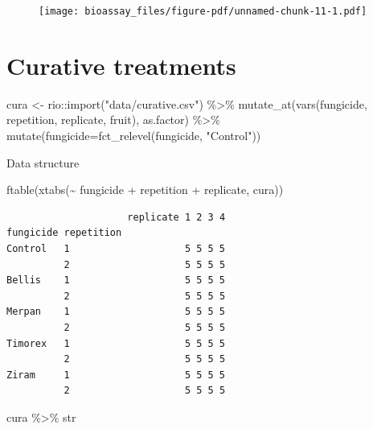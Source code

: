 \documentclass[
  letterpaper,
  DIV=11,
  numbers=noendperiod]{scrreport}
\newenvironment{Shaded}{\begin{snugshade}}{\end{snugshade}}
\newcommand{\AttributeTok}[1]{\textcolor[rgb]{0.40,0.45,0.13}{#1}}
\newcommand{\FunctionTok}[1]{\textcolor[rgb]{0.28,0.35,0.67}{#1}}
\newcommand{\NormalTok}[1]{\textcolor[rgb]{0.00,0.23,0.31}{#1}}
\newcommand{\OtherTok}[1]{\textcolor[rgb]{0.00,0.23,0.31}{#1}}
\newcommand{\SpecialCharTok}[1]{\textcolor[rgb]{0.37,0.37,0.37}{#1}}
\newcommand{\StringTok}[1]{\textcolor[rgb]{0.13,0.47,0.30}{#1}}
\begin{document}
\begin{figure}[H]

{\centering \texttt{[image: bioassay\_files/figure-pdf/unnamed-chunk-11-1.pdf]}

}

\end{figure}

\hypertarget{curative-treatments}{%
\section{Curative treatments}\label{curative-treatments}}

\begin{Shaded}
\begin{Highlighting}[]
\NormalTok{cura }\OtherTok{\textless{}{-}}\NormalTok{ rio}\SpecialCharTok{::}\FunctionTok{import}\NormalTok{(}\StringTok{"data/curative.csv"}\NormalTok{) }\SpecialCharTok{\%\textgreater{}\%} 
   \FunctionTok{mutate\_at}\NormalTok{(}\FunctionTok{vars}\NormalTok{(fungicide, repetition, replicate, fruit), as.factor) }\SpecialCharTok{\%\textgreater{}\%} 
  \FunctionTok{mutate}\NormalTok{(}\AttributeTok{fungicide=}\FunctionTok{fct\_relevel}\NormalTok{(fungicide, }\StringTok{"Control"}\NormalTok{)) }
\end{Highlighting}
\end{Shaded}

Data structure

\begin{Shaded}
\begin{Highlighting}[]
\FunctionTok{ftable}\NormalTok{(}\FunctionTok{xtabs}\NormalTok{(}\SpecialCharTok{\textasciitilde{}}\NormalTok{ fungicide }\SpecialCharTok{+}\NormalTok{ repetition }\SpecialCharTok{+}\NormalTok{ replicate, cura))}
\end{Highlighting}
\end{Shaded}

\begin{verbatim}
                     replicate 1 2 3 4
fungicide repetition                  
Control   1                    5 5 5 5
          2                    5 5 5 5
Bellis    1                    5 5 5 5
          2                    5 5 5 5
Merpan    1                    5 5 5 5
          2                    5 5 5 5
Timorex   1                    5 5 5 5
          2                    5 5 5 5
Ziram     1                    5 5 5 5
          2                    5 5 5 5
\end{verbatim}

\begin{Shaded}
\begin{Highlighting}[]
\NormalTok{cura }\SpecialCharTok{\%\textgreater{}\%}\NormalTok{ str}
\end{Highlighting}
\end{Shaded}
\end{document}
